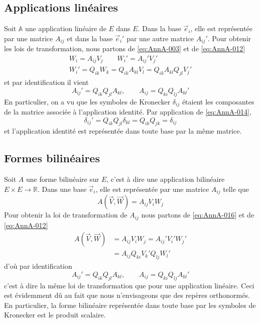 \subsection{Applications linéaires}
Soit $\mathbb{A}$ une application linéaire de $E$ dans $E$. 
Dans la base $\vec{e}_i$, elle est représentée par une matrice $A_{ij}$ et dans la base $\vec{e}_i{}'$ par une autre matrice $A_{ij}'$.
Pour obtenir les lois de transformation, nous partons de \eqref{eq:AnnA-003} et de \eqref{eq:AnnA-012}
\begin{gather*}
    W_i = A_{ij} V_j \qquad W_i' = A_{ij}' V_j'\\
    W_i' = Q_{ik} W_k = Q_{ik} A_{kl} V_l = Q_{ik} A_{kl} Q_{jl} V_{j}'
\end{gather*}
et par identification il vient
\begin{equation}
    A_{ij}' = Q_{ik} Q_{jl} A_{kl}, \qquad A_{ij} = Q_{ki} Q_{lj} A_{kl}'
    \label{eq:AnnA-014}
\end{equation}
En particulier, on a vu que les symboles de Kronecker $\delta_{ij}$ étaient les composantes de la matrice associée à l'application identité. 
Par application de \eqref{eq:AnnA-014},
\begin{equation}
    \delta_{ij}' = Q_{ik} Q_{jl} \delta_{kl} = Q_{ik} Q_{jk} = \delta_{ij}
    \label{eq:AnnA-015}
\end{equation}
et l'application identité est représentée dans toute base par la même matrice.
\subsection{Formes bilinéaires}
Soit $A$ une forme bilinéaire sur $E$, c'est à dire une application bilinéaire $E\times E \rightarrow \mathbb{R}$.
Dans une base $\vec{e}_i$, elle est représentée par une matrice $A_{ij}$ telle que
\begin{equation}
    A \left( \vec{V}, \vec{W} \right) = A_{ij} V_i W_j
    \label{eq:AnnA-016}
\end{equation}
Pour obtenir la loi de transformation de $A_{ij}$ nous partons de \eqref{eq:AnnA-016} et de \eqref{eq:AnnA-012}
\begin{align}
    A\left( \vec{V}, \vec{W} \right) &= A_{ij} V_i W_j = A_{ij}' V_i'W_j'\\
    &= A_{ij} Q_{ki} V_k' Q_{lj} W_l' \nonumber
    \label{eq:AnnA-017}
\end{align}
d'où par identification
\begin{equation}
    A_{ij}' = Q_{ik} Q_{jl} A_{kl}, \qquad A_{ij} = Q_{ki} Q_{lj} A_{kl}'
    \label{eq:AnnA-018}
\end{equation}
c'est à dire la même loi de transformation que pour une application linéaire.
Ceci est évidemment dû au fait que nous n'envisageons que des repères orthonormés.
En particulier, la forme bilinéaire représentée dans toute base par les symboles de Kronecker est le produit scalaire.
